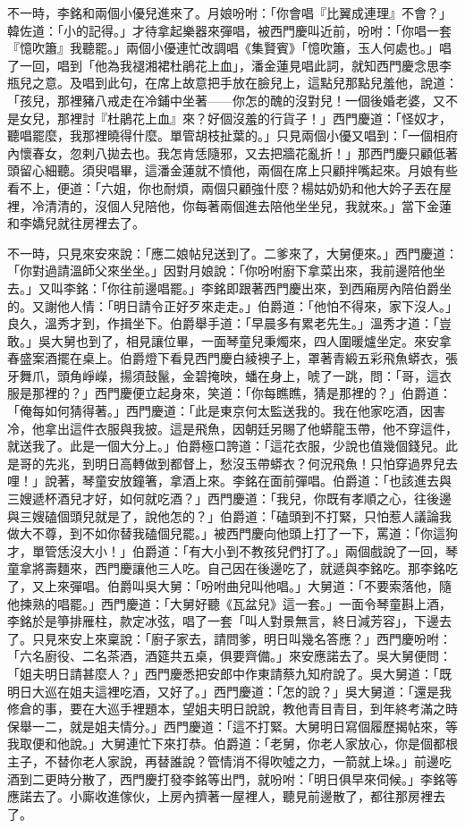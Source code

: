 不一時，李銘和兩個小優兒進來了。月娘吩咐：「你會唱『比翼成連理』不會？」韓佐道：「小的記得。」才待拿起樂器來彈唱，被西門慶叫近前，吩咐：「你唱一套『憶吹簫』我聽罷。」兩個小優連忙改調唱《集賢賓》「憶吹簫，玉人何處也。」唱了一回，唱到「他為我褪湘裙杜鵑花上血」，潘金蓮見唱此詞，就知西門慶念思李瓶兒之意。及唱到此句，在席上故意把手放在臉兒上，這點兒那點兒羞他，說道：「孩兒，那裡豬八戒走在冷鋪中坐著——你怎的醜的沒對兒！一個後婚老婆，又不是女兒，那裡討『杜鵑花上血』來？好個沒羞的行貨子！」西門慶道：「怪奴才，聽唱罷麼，我那裡曉得什麼。單管胡枝扯葉的。」只見兩個小優又唱到：「一個相府內懷春女，忽剌八拋去也。我怎肯恁隨邪，又去把牆花亂折！」那西門慶只顧低著頭留心細聽。須臾唱畢，這潘金蓮就不憤他，兩個在席上只顧拌嘴起來。月娘有些看不上，便道：「六姐，你也耐煩，兩個只顧強什麼？楊姑奶奶和他大妗子丟在屋裡，冷清清的，沒個人兒陪他，你每著兩個進去陪他坐坐兒，我就來。」當下金蓮和李嬌兒就往房裡去了。

不一時，只見來安來說：「應二娘帖兒送到了。二爹來了，大舅便來。」西門慶道：「你對過請溫師父來坐坐。」因對月娘說：「你吩咐廚下拿菜出來，我前邊陪他坐去。」又叫李銘：「你往前邊唱罷。」李銘即跟著西門慶出來，到西廂房內陪伯爵坐的。又謝他人情：「明日請令正好歹來走走。」伯爵道：「他怕不得來，家下沒人。」良久，溫秀才到，作揖坐下。伯爵舉手道：「早晨多有累老先生。」溫秀才道：「豈敢。」吳大舅也到了，相見讓位畢，一面琴童兒秉燭來，四人圍暖爐坐定。來安拿春盛案酒擺在桌上。伯爵燈下看見西門慶白綾襖子上，罩著青緞五彩飛魚蟒衣，張牙舞爪，頭角崢嶸，揚須鼓鬣，金碧掩映，蟠在身上，唬了一跳，問：「哥，這衣服是那裡的？」西門慶便立起身來，笑道：「你每瞧瞧，猜是那裡的？」伯爵道：「俺每如何猜得著。」西門慶道：「此是東京何太監送我的。我在他家吃酒，因害冷，他拿出這件衣服與我披。這是飛魚，因朝廷另賜了他蟒龍玉帶，他不穿這件，就送我了。此是一個大分上。」伯爵極口誇道：「這花衣服，少說也值幾個錢兒。此是哥的先兆，到明日高轉做到都督上，愁沒玉帶蟒衣？何況飛魚！只怕穿過界兒去哩！」說著，琴童安放鐘箸，拿酒上來。李銘在面前彈唱。伯爵道：「也該進去與三嫂遞杯酒兒才好，如何就吃酒？」西門慶道：「我兒，你既有孝順之心，往後邊與三嫂磕個頭兒就是了，說他怎的？」伯爵道：「磕頭到不打緊，只怕惹人議論我做大不尊，到不如你替我磕個兒罷。」被西門慶向他頭上打了一下，罵道：「你這狗才，單管恁沒大小！」伯爵道：「有大小到不教孩兒們打了。」兩個戲說了一回，琴童拿將壽麵來，西門慶讓他三人吃。自己因在後邊吃了，就遞與李銘吃。那李銘吃了，又上來彈唱。伯爵叫吳大舅：「吩咐曲兒叫他唱。」大舅道：「不要索落他，隨他揀熟的唱罷。」西門慶道：「大舅好聽《瓦盆兒》這一套。」一面令琴童斟上酒，李銘於是箏排雁柱，款定冰弦，唱了一套「叫人對景無言，終日減芳容」，下邊去了。只見來安上來稟說：「廚子家去，請問爹，明日叫幾名答應？」西門慶吩咐：「六名廚役、二名茶酒，酒筵共五桌，俱要齊備。」來安應諾去了。吳大舅便問：「姐夫明日請甚麼人？」西門慶悉把安郎中作東請蔡九知府說了。吳大舅道：「既明日大巡在姐夫這裡吃酒，又好了。」西門慶道：「怎的說？」吳大舅道：「還是我修倉的事，要在大巡手裡題本，望姐夫明日說說，教他青目青目，到年終考滿之時保舉一二，就是姐夫情分。」西門慶道：「這不打緊。大舅明日寫個履歷揭帖來，等我取便和他說。」大舅連忙下來打恭。伯爵道：「老舅，你老人家放心，你是個都根主子，不替你老人家說，再替誰說？管情消不得吹噓之力，一箭就上垛。」前邊吃酒到二更時分散了，西門慶打發李銘等出門，就吩咐：「明日俱早來伺候。」李銘等應諾去了。小廝收進傢伙，上房內擠著一屋裡人，聽見前邊散了，都往那房裡去了。

